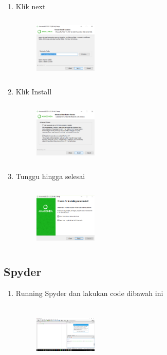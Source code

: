 \begin{enumerate}
	\item Klik next
	\begin{figure}[H]
		\centering
		\includegraphics[width=3cm,height=3cm]{figures/dezha/Screenshot5.png}
		\label{Memilih letak dictionary}
		\end{figure}

	\item Klik Install
	\begin{figure}[H]
		\centering
		\includegraphics[width=3cm,height=3cm]{figures/dezha/Screenshot7.png}
		\label{Pilih Register Anaconda as my default Python 3.2}
		\end{figure}

	\item Tunggu hingga selesai
	\begin{figure}[H]
		\centering
		\includegraphics[width=3cm,height=3cm]{figures/dezha/Screenshot9.png}
		\label{Finish}
		\end{figure}

\end{enumerate}
\subsection{Spyder}
\begin{enumerate}
	\item Running Spyder dan lakukan code dibawah ini
	\begin{figure}[H]
		\centering
		\includegraphics[width=3cm,height=3cm]{figures/dezha/Screenshot10.png}
		\label{Finish}
		\end{figure}

\end{enumerate}

